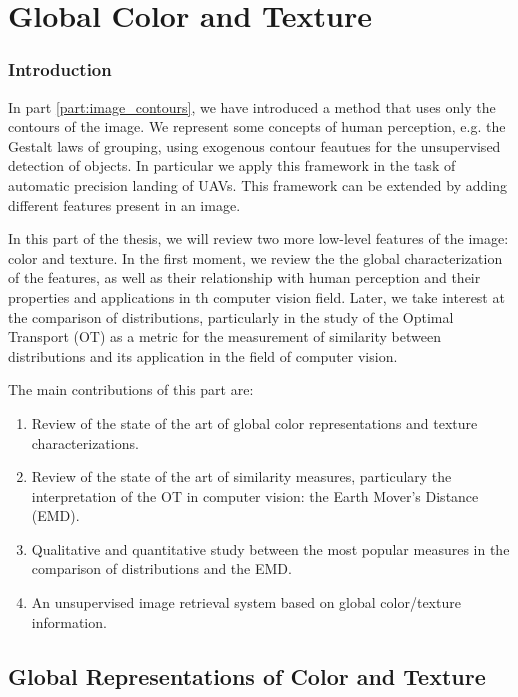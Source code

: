\part{Global Color and Texture}%

\section*{Introduction}
In part \ref{part:image_contours}, we have introduced a method that uses only the contours of the image. We represent some concepts of human perception, e.g. the Gestalt laws of grouping, using exogenous contour feautues for the unsupervised detection of objects. In particular we apply this framework in the task of automatic precision landing of UAVs. This framework can be extended by adding different features present in an image.

In this part of the thesis, we will review two more low-level features of the image: color and texture. In the first moment, we review the the global characterization of the features, as well as their relationship with human perception and their properties and applications in th computer vision field. Later, we take interest at the comparison of distributions, particularly in the study of the Optimal Transport (OT) as a metric for the measurement of similarity between distributions and its application in the field of computer vision.


The main contributions of this part are:

\begin{enumerate}
	\item Review of the state of the art of global color representations and texture characterizations.
	\item Review of the state of the art of similarity measures, particulary the interpretation of the OT in computer vision: the Earth Mover's Distance (EMD).
	\item Qualitative and quantitative study between the most popular measures in the comparison of distributions and the EMD. 
	\item An unsupervised image retrieval system based on global color/texture information.
\end{enumerate}



\chapter{Global Representations of Color and Texture }


